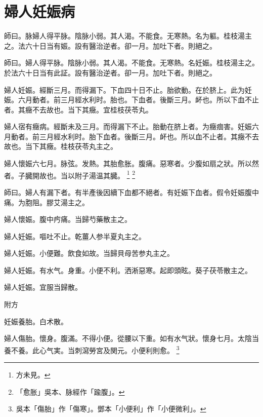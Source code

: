 





\chapter{婦人妊娠病}

師曰。脉婦人得平脉。陰脉小弱。其人渴。不能食。无寒熱。名为軀。桂枝湯主之。法六十日当有娠。設有醫治逆者。卻一月。加吐下者。則絕之。{\wuben}

師曰。婦人得平脉。陰脉小弱。其人渴。不能食。无寒熱。名妊娠。桂枝湯主之。於法六十日当有此証。設有醫治逆者。卻一月。加吐下者。則絕之。{\dengben}

婦人妊娠。經斷三月。而得漏下。下血四十日不止。胎欲動。在於脐上。此为妊娠。六月動者。前三月經水利时。胎也。下血者。後斷三月。衃也。所以下血不止者。其癥不去故也。当下其癥。宜桂枝茯苓丸。{\wuben}

婦人宿有癥病。經斷未及三月。而得漏下不止。胎動在脐上者。为癥痼害。妊娠六月動者。前三月經水利时。胎下血者。後斷三月。衃也。所以血不止者。其癥不去故也。当下其癥。桂枝茯苓丸主之。{\dengben}

婦人懷娠六七月。脉弦。发熱。其胎愈胀。腹痛。惡寒者。少腹如扇之狀。所以然者。子臓開故也。当以附子湯温其臓。
	\footnote{方未見。}
	\footnote{「愈胀」吳本、脉經作「踰腹」。}

師曰。婦人有漏下者。有半產後因續下血都不絕者。有妊娠下血者。假令妊娠腹中痛。为胞阻。膠艾湯主之。

婦人懷娠。腹中㽲痛。当歸芍藥散主之。

{\khaaitp 婦人}妊娠。嘔吐不止。乾薑人参半夏丸主之。

{\khaaitp 婦人}妊娠。小便難。飲食如故。{\khaaitp 当}歸{\khaaitp 貝}母苦参丸主之。

{\khaaitp 婦人}妊娠。有水气。身重。小便不利。洒淅惡寒。起即頭眩。葵子茯苓散主之。

婦人妊娠。宜服当歸散。

附方

妊娠養胎。白术散。

婦人傷胎。懷身。腹滿。不得小便。從腰以下重。如有水气狀。懷身七月。太陰当養不養。此心气実。当刺瀉勞宮及関元。小便利則愈。
	\footnote{吳本「傷胎」作「傷寒」。鄧本「小便利」作「小便微利」。}

